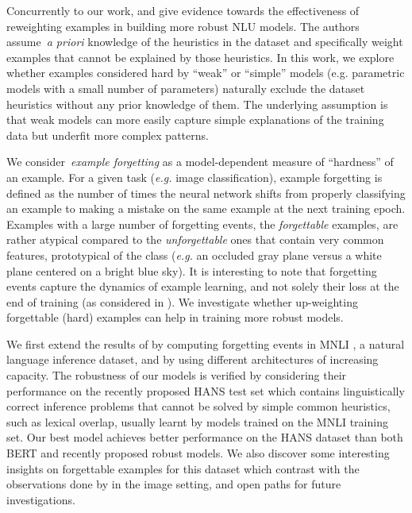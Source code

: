 Concurrently to our work,  and  give evidence towards the effectiveness of reweighting examples in building more robust NLU models. The authors assume~\emph{a priori} knowledge of the heuristics in the dataset and specifically weight examples that cannot be explained by those heuristics. In this work, we explore whether examples considered hard by ``weak'' or ``simple'' models (e.g. parametric models with a small number of parameters) naturally exclude the dataset heuristics without any prior knowledge of them. The underlying assumption is that weak models can more easily capture simple explanations of the training data but underfit more complex patterns.

We consider~\emph{example forgetting} \cite{toneva2018empirical} as a model-dependent measure of ``hardness'' of an example. For a given task (\textit{e.g.} image classification), example forgetting is defined as the number of times the neural network shifts from properly classifying an example to making a mistake on the same example at the next training epoch. Examples with a large number of forgetting events, the \emph{forgettable} examples, are rather atypical compared to the \emph{unforgettable} ones that contain very common features, prototypical of the class (\textit{e.g.} an occluded gray plane versus a white plane centered on a bright blue sky). It is interesting to note that forgetting events capture the dynamics of example learning, and not solely their loss at the end of training (as considered in ). We investigate whether up-weighting forgettable (hard) examples can help in training more robust models.  

We first extend the results of  by computing forgetting events in MNLI \cite{williams2017broad}, a natural language inference dataset, and by using different architectures of increasing capacity. The robustness of our models is verified by considering their performance on the recently proposed HANS test set \cite{linzen2019right} which contains linguistically correct inference problems that cannot be solved by simple common heuristics, such as lexical overlap, usually learnt by models trained on the MNLI training set. Our best model achieves better performance on the HANS dataset than both BERT and recently proposed robust models. We also discover some interesting insights on forgettable examples for this dataset which contrast with the observations done by  in the image setting, and open paths for future investigations.

 


